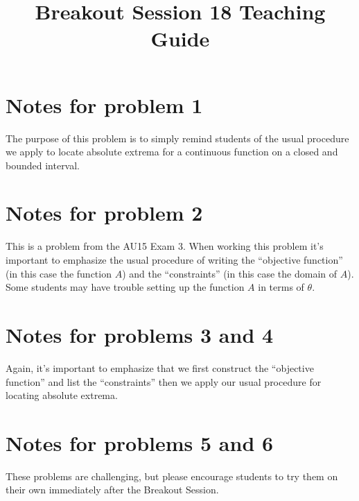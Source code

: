 \documentclass[handout,nooutcomes]{ximera}
\title{Breakout Session 18 Teaching Guide}
\begin{document}
\begin{abstract}

  
\end{abstract}
\maketitle

\section{Notes for problem 1}
The purpose of this problem is to simply remind students of the usual procedure we apply to locate absolute extrema for a continuous function on a closed and bounded interval.

\section{Notes for problem 2}
This is a problem from the AU15 Exam 3.
When working this problem it's important to emphasize the usual procedure of writing the ``objective function'' (in this case the function $A$) and the ``constraints'' (in this case the domain of $A$).
Some students may have trouble setting up the function $A$ in terms of $\theta$.

\section{Notes for problems 3 and 4}
Again, it's important to emphasize that we first construct the ``objective function'' and list the ``constraints'' then we apply our usual procedure for locating absolute extrema.

\section{Notes for problems 5 and 6}
These problems are challenging, but please encourage students to try them on their own immediately after the Breakout Session.
\end{document}
